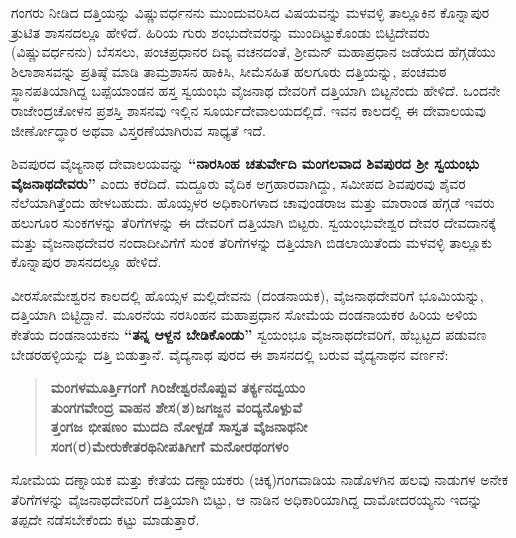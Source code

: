 ಗಂಗರು ನೀಡಿದ ದತ್ತಿಯನ್ನು ವಿಷ್ಣುವರ್ಧನನು ಮುಂದುವರಿಸಿದ ವಿಷಯವನ್ನು ಮಳವಳ್ಳಿ ತಾಲ್ಲೂಕಿನ ಕೊನ್ನಾಪುರ ತ್ರುಟಿತ ಶಾಸನದಲ್ಲೂ ಹೇಳಿದೆ. ಹಿರಿಯ ಗುರು ಶಂಭುದೇವರನ್ನು ಮುಂದಿಟ್ಟುಕೊಂಡು ಬಿಟ್ಟಿದೇವರು (ವಿಷ್ಣುವರ್ಧನನು) ಬೆಸಸಲು, ಪಂಚಪ್ರಧಾನರ ದಿವ್ಯ ವಚನದಂತೆ, ಶ‍್ರೀಮನ್​ ಮಹಾಪ್ರಧಾನ ಜಡೆಯದ ಹೆಗ್ಗಡೆಯು ಶಿಲಾಶಾಸವನ್ನು ಪ್ರತಿಷ್ಠೆ ಮಾಡಿ ತಾಮ್ರಶಾಸನ ಹಾಕಿಸಿ, ಸೀಮೆಸಹಿತ ಹಲಗೂರು ದತ್ತಿಯನ್ನು, ಪಂಚಮಠ ಸ್ಥಾನಪತಿಯಾಗಿದ್ದ ಬಪ್ಪೆಯಾಂಡನ ಹಸ್ತ ಸ್ವಯಂಭು ವೈಜನಾಥ ದೇವರಿಗೆ ದತ್ತಿಯಾಗಿ ಬಿಟ್ಟನೆಂದು ಹೇಳಿದೆ. ಒಂದನೇ ರಾಜೇಂದ್ರಚೋಳನ ಪ್ರಶಸ್ತಿ ಶಾಸನವು ಇಲ್ಲಿನ ಸೂರ್ಯದೇವಾಲಯದಲ್ಲಿದೆ. ಇವನ ಕಾಲದಲ್ಲಿ ಈ ದೇವಾಲಯವು ಜೀರ್ಣೋದ್ಧಾರ ಅಥವಾ ವಿಸ್ತರಣೆಯಾಗಿರುವ ಸಾಧ್ಯತೆ ಇದೆ.

ಶಿವಪುರದ ವೈಜ್ಯನಾಥ ದೇವಾಲಯವನ್ನು \textbf{“ನಾರಸಿಂಹ ಚತುರ್ವೇದಿ ಮಂಗಲವಾದ ಶಿವಪುರದ ಶ‍್ರೀ ಸ್ವಯಂಭು ವೈಜನಾಥದೇವರು”} ಎಂದು ಕರೆದಿದೆ. ಮದ್ದೂರು ವೈದಿಕ ಅಗ್ರಹಾರವಾಗಿದ್ದು, ಸಮೀಪದ ಶಿವಪುರವು ಶೈವರ ನೆಲೆಯಾಗಿತ್ತೆಂದು ಹೇಳಬಹುದು. ಹೊಯ್ಸಳರ ಅಧಿಕಾರಿಗಳಾದ ಚಾವುಂಡರಾಜ ಮತ್ತು ಮಾರಾಂಡ ಹೆಗ್ಗಡೆ ಇವರು ಹಲುಗೂರ ಸುಂಕಗಳನ್ನು ತೆರಿಗೆಗಳನ್ನು ಈ ದೇವರಿಗೆ ದತ್ತಿಯಾಗಿ ಬಿಟ್ಟರು. ಸ್ವಯಂಭುವೇಶ್ವರ ದೇವರ ದೇವದಾನಕ್ಕೆ ಮತ್ತು ವೈಜನಾಥದೇವರ ನಂದಾದೀವಿಗೆಗೆ ಸುಂಕ ತೆರಿಗೆಗಳನ್ನು ದತ್ತಿಯಾಗಿ ಬಿಡಲಾಯಿತೆಂದು ಮಳವಳ್ಳಿ ತಾಲ್ಲೂಕು ಕೊನ್ನಾಪುರ ಶಾಸನದಲ್ಲೂ ಹೇಳಿದೆ.

ವೀರಸೋಮೇಶ್ವರನ ಕಾಲದಲ್ಲಿ ಹೊಯ್ಸಳ ಮಲ್ಲಿದೇವನು  (ದಂಡನಾಯಕ), ವೈಜನಾಥದೇವರಿಗೆ ಭೂಮಿಯನ್ನು, ದತ್ತಿಯಾಗಿ ಬಿಟ್ಟಿದ್ದಾನೆ. ಮೂರನೆಯ ನರಸಿಂಹನ ಮಹಾಪ್ರಧಾನ ಸೋಮೆಯ ದಂಡನಾಯಕರ ಹಿರಿಯ ಅಳಿಯ ಕೇತೆಯ ದಂಡನಾಯಕನು \textbf{“ತನ್ನ ಆಳ್ದನ ಬೇಡಿಕೊಂಡು”} ಸ್ವಯಂಭೂ ವೈಜನಾಥದೇವರಿಗೆ, ಹೆಬ್ಬಟ್ಟದ ಪಡುವಣ ಬೇಡರಹಳ್ಳಿಯನ್ನು ದತ್ತಿ ಬಿಡುತ್ತಾನೆ. ವೈದ್ಯನಾಥ ಪುರದ ಈ ಶಾಸನದಲ್ಲಿ ಬರುವ ವೈದ್ಯನಾಥನ ವರ್ಣನೆ:

\begin{verse}
\textbf{ಮಂಗಳಮೂರ್ತ್ತಿಗಂಗೆ ಗಿರಿಜೇಶ್ವರನೊಪ್ಪುವ ತರ್ಕ್ಯನದ್ವಯಂ} \\\textbf{ತುಂಗಗವೇಂದ್ರ ವಾಹನ ಶೇಸ(ಶ)ಜಗಜ್ಜನ ವಂದ್ಯನೊಳ್ಪುವೆ} \\\textbf{ತ್ತಂಗಜ ಭೀಷಣಂ ಮುದದಿ ನೋಳ್ಪಡೆ ಸಾಸ್ವತ ವೈಜನಾಥನೀ} \\\textbf{ಸಂಗ(ರ)ಮೇರುಕೇತರಥಿನೀಪತಿಗೀಗೆ ಮನೋರಥಂಗಳಂ }
\end{verse}

ಸೋಮೆಯ ದಣ್ನಾಯಕ ಮತ್ತು ಕೇತೆಯ ದಣ್ನಾಯಕರು (ಚಿಕ್ಕ)ಗಂಗವಾಡಿಯ ನಾಡೊಳಗಿನ ಹಲವು ನಾಡುಗಳ ಅನೇಕ ತೆರಿಗೆಗಳನ್ನು ವೈಜನಾಥದೇವರಿಗೆ ದತ್ತಿಯಾಗಿ ಬಿಟ್ಟು, ಆ ನಾಡಿನ ಅಧಿಕಾರಿಯಾಗಿದ್ದ ದಾಮೋದರಯ್ಯನು ಇದನ್ನು ತಪ್ಪದೇ ನಡೆಸಬೇಕೆಂದು ಕಟ್ಟು ಮಾಡುತ್ತಾರೆ.

